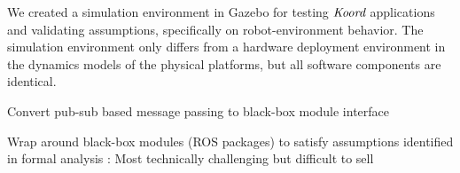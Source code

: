 \begin{noinditem}
\item We created a simulation environment in Gazebo for testing $\emph{Koord}$ applications and validating assumptions, specifically on robot-environment behavior. The simulation environment only differs from a hardware deployment environment in the dynamics models of the physical platforms, but all software components are identical.

\item Convert pub-sub based message passing to black-box module interface
\item Wrap around black-box modules (ROS packages) to satisfy assumptions identified in formal analysis : Most technically challenging but difficult to sell


\end{noinditem}
\makeatletter
\let\origsection\section
\renewcommand\section{\@ifstar{\starsection}{\nostarsection}}

\newcommand\nostarsection[1]
{\sectionprelude\origsection{#1}\sectionpostlude}

\newcommand\starsection[1]
{\sectionprelude\origsection*{#1}\sectionpostlude}

\newcommand\sectionprelude{%
  \vspace{-0.5em}
}

\newcommand\sectionpostlude{%
  \vspace{0em}
}
\makeatother
%
%
%


